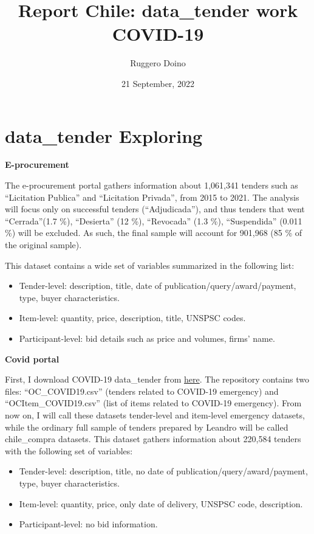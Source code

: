 \documentclass[
]{article}
\title{Report Chile: data\_tender work COVID-19}
\author{Ruggero Doino}
\date{21 September, 2022}
\begin{document}
\maketitle

{
\setcounter{tocdepth}{2}
\tableofcontents
}
\hypertarget{data_tender-exploring}{%
\section{data\_tender Exploring}\label{data_tender-exploring}}

\textbf{E-procurement}

The e-procurement portal gathers information about 1,061,341 tenders
such as ``Licitation Publica'' and ``Licitation Privada'', from 2015 to
2021. The analysis will focus only on successful tenders
(``Adjudicada''), and thus tenders that went ``Cerrada''(1.7 \%),
``Desierta'' (12 \%), ``Revocada'' (1.3 \%), ``Suspendida'' (0.011 \%)
will be excluded. As such, the final sample will account for 901,968 (85
\% of the original sample).

This dataset contains a wide set of variables summarized in the
following list:

\begin{itemize}
  \item Tender-level: description, title, date of publication/query/award/payment, type, buyer characteristics.
  \item Item-level: quantity, price, description, title, UNSPSC codes.
  \item Participant-level: bid details such as price and volumes, firms' name.
\end{itemize}

\textbf{Covid portal}

First, I download COVID-19 data\_tender from
\href{https://app.powerbi.com/view?r=eyJrIjoiNmU2NzBkNzUtYmM1Mi00NGVmLTljYWQtNTIxNTlhMTQ4ZjQ5IiwidCI6ImIwMGQ1ZjQ5LTk4YWMtNGJjNS1hMmM5LWNhZmRmNzEyMTZmMCIsImMiOjR9}{here}.
The repository contains two files: ``OC\_COVID19.csv'' (tenders related
to COVID-19 emergency) and ``OCItem\_COVID19.csv'' (list of items
related to COVID-19 emergency). From now on, I will call these datasets
tender-level and item-level emergency datasets, while the ordinary full
sample of tenders prepared by Leandro will be called chile\_compra
datasets. This dataset gathers information about 220,584 tenders with
the following set of variables:

\begin{itemize}
  \item Tender-level: description, title, no date of publication/query/award/payment, type, buyer characteristics.
  \item Item-level: quantity, price, only date of delivery, UNSPSC code, description. 
  \item Participant-level: no bid information.
\end{itemize}
\end{document}
